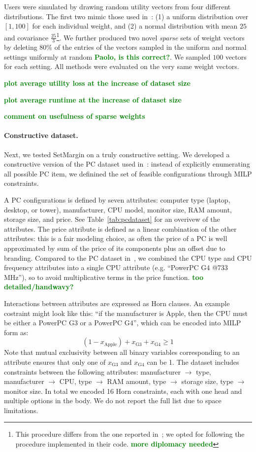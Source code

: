 \documentclass{article}
\renewcommand\[{\begin{equation}}
\renewcommand\]{\end{equation}}
\newcommand{\stefano}[1]{{\bf \textcolor{green}{{\fbox{Stefano:} #1}}}}
\begin{document}
Users were simulated by drawing random utility vectors from four different
distributions. The first two mimic those used in~\cite{guo2010real}: (1) a
uniform distribution over $[1, 100]$ for each individual weight, and (2) a
normal distribution with mean $25$ and covariance $\frac{25}{3}$\footnote{This
procedure differs from the one reported in~\cite{guo2010real}; we opted for
following the procedure implemented in their code. \stefano{more diplomacy needed}}.
We further produced two novel {\em sparse} sets of weight vectors by deleting
$80\%$ of the entries of the vectors sampled in the uniform and normal settings
uniformly at random \stefano{Paolo, is this correct?}. We sampled $100$
vectors for each setting. All methods were evaluated on the very same weight
vectors.

\stefano{plot average utility loss at the increase of dataset size}

\stefano{plot average runtime at the increase of dataset size}

\stefano{comment on usefulness of sparse weights}

\paragraph{Constructive dataset.} Next, we tested {\sc SetMargin} on a truly
constructive setting. We developed a constructive version of the PC dataset
used in~\cite{guo2010real}: instead of explicitly enumerating all possible PC
item, we definined the set of feasible configurations through MILP constraints.

A PC configurations is defined by seven attributes: computer type (laptop,
desktop, or tower), manufacturer, CPU model, monitor size, RAM amount, storage
size, and price. See Table~\ref{tab:pcdataset} for an overivew of the
attributes. The price attribute is defined as a linear combination of the other
attributes: this is a fair modeling choice, as often the price of a PC is
well approximated by sum of the price of its components plus an offset due to
branding. Compared to the PC dataset in~\cite{guo2010real}, we combined the CPU
type and CPU frequency attributes into a single CPU attribute (e.g. ``PowerPC
G4 @733 MHz''), so to avoid multiplicative terms in the price function.
\stefano{too detailed/handwavy?}

Interactions between attributes are expressed as Horn clauses. An example
costraint might look like this: ``if the manufacturer is Apple, then the
CPU must be either a PowerPC G3 or a PowerPC G4'', which can be encoded
into MILP form as:
%
$$ (1 - x_\text{Apple}) + x_\text{G3} + x_\text{G4} \ge 1 $$
%
Note that mutual exclusivity between all binary variables corresponding to an
attribute ensures that only one of $x_\text{G3}$ and $x_\text{G4}$ can be 1.
The dataset includes constraints between the following attributes: manufacturer
$\to$ type, manufacturer $\to$ CPU, type $\to$ RAM amount, type $\to$ storage
size, type $\to$ monitor size. In total we encoded 16 Horn constraints, each
with one head and multiple options in the body. We do not report the full
list due to space limitations.
\end{document}

